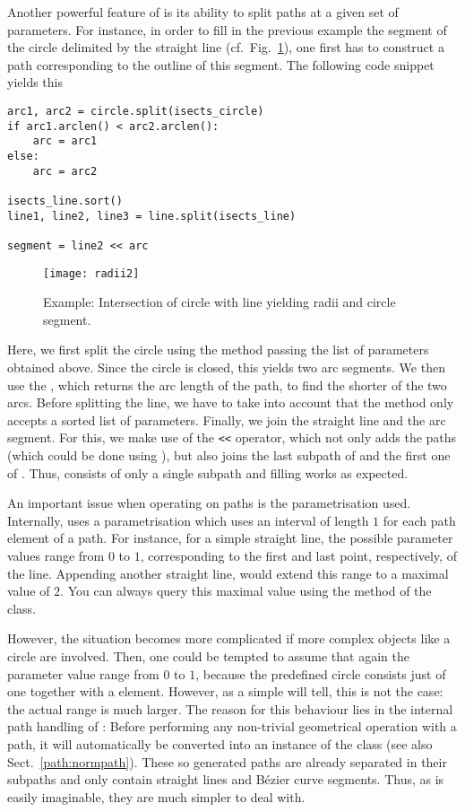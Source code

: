 Another powerful feature of \PyX{} is its ability to split paths at a
given set of parameters. For instance, in order to fill in the
previous example the segment of the circle delimited by the straight
line (cf.\ Fig.~\ref{fig:radii2}), one first has to construct a path
corresponding to the outline of this segment. The following code
snippet yields this 
\begin{verbatim}
arc1, arc2 = circle.split(isects_circle)
if arc1.arclen() < arc2.arclen():
    arc = arc1
else:
    arc = arc2

isects_line.sort()
line1, line2, line3 = line.split(isects_line)

segment = line2 << arc
\end{verbatim}
\begin{figure}
\centerline{\texttt{[image: radii2]}}
\caption{Example: Intersection of circle with line yielding radii and
  circle segment.}
\label{fig:radii2}
\end{figure}
Here, we first split the circle using the  method passing
the list of parameters obtained above. Since the circle is closed,
this yields two arc segments. We then use the , which
returns the arc length of the path, to find the shorter of the two
arcs. Before splitting the line, we have to take into account that
the  method only accepts a sorted list of parameters.
Finally, we join the straight line and the arc segment. For
this, we make use of the \verb|<<| operator, which not only adds
the paths (which could be done using ), but also
joins the last subpath of  and the first one of
. Thus,  consists of only a single subpath
and filling works as expected.

An important issue when operating on paths is the parametrisation
used. Internally, \PyX{} uses a parametrisation which uses an interval
of length $1$ for each path element of a path. For instance, for a
simple straight line, the possible parameter values range from $0$ to
$1$, corresponding to the first and last point, respectively, of the
line. Appending another straight line, would extend this range to a
maximal value of $2$. You can always query this maximal value using
the  method of the  class.  

However, the situation becomes more complicated if more complex
objects like a circle are involved. Then, one could be tempted to
assume that again the parameter value range from $0$ to $1$, because
the predefined circle consists just of one  together with a
 element. However, as a simple  will tell, this is not the case: the actual range is
much larger. The reason for this behaviour lies in the internal path
handling of \PyX: Before performing any non-trivial geometrical
operation with a path, it will automatically be converted into an
instance of the  class (see also
Sect.~\ref{path:normpath}). These so generated paths are already
separated in their subpaths and only contain straight lines and
B\'ezier curve segments. Thus, as is easily imaginable, they are much
simpler to deal with.

